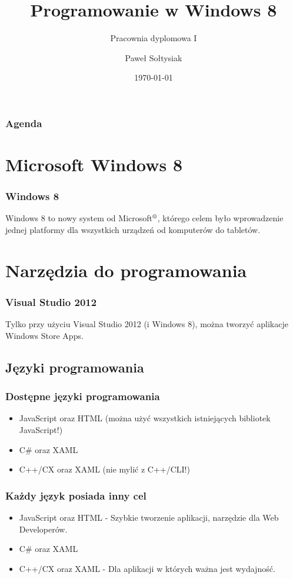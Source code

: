 \documentclass{beamer}
\title{Programowanie w Windows 8}
\subtitle{Pracownia dyplomowa I}
\author{Paweł Sołtysiak}
\institute{Wydział Informatyki\\ Zachodniopomorski Uniwersytet Technologiczny w Szczecinie}
\date{\today}
\begin{document}
\begin{frame}
\titlepage
\end{frame} 


\begin{frame}
\frametitle{Agenda} 
\tableofcontents
\end{frame} 

\section{Microsoft Windows 8}
\begin{frame}
\frametitle{Windows 8} 
Windows 8 to nowy system od Microsoft$\textsuperscript{\textregistered}$, którego celem było wprowadzenie jednej platformy dla wszystkich urządzeń od komputerów do tabletów.
\end{frame}

\section{Narzędzia do programowania}
\begin{frame}
\frametitle{Visual Studio 2012} 
Tylko przy użyciu Visual Studio 2012 (i Windows 8), można tworzyć aplikacje Windows Store Apps.
\end{frame}

\subsection{Języki programowania}
\begin{frame}
\frametitle{Dostępne języki programowania} 
\begin{itemize}
\item JavaScript oraz HTML (można użyć wszystkich istniejących bibliotek JavaScript!)
\item C\# oraz XAML
\item C++/CX oraz XAML (nie mylić z C++/CLI!)
\end{itemize} 
\end{frame}

\begin{frame}
\frametitle{Każdy język posiada inny cel} 
\begin{itemize}
\item JavaScript oraz HTML - Szybkie tworzenie aplikacji, narzędzie dla Web Developerów.
\item C\# oraz XAML
\item C++/CX oraz XAML - Dla aplikacji w których ważna jest wydajność.
\end{itemize} 
\end{frame}
\end{document}
